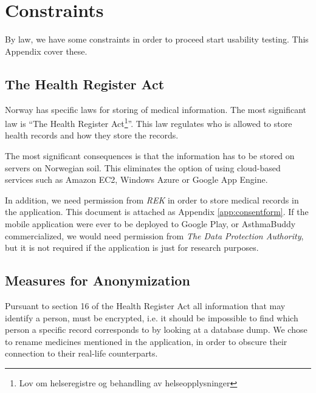 
\chapter{Constraints}
\label{chp:securityrequirements}

By law, we have some constraints in order to proceed start usability testing. This Appendix cover these. 

\section{The Health Register Act}
\label{sec:helseregisterloven}

Norway has specific laws for storing of medical information. The most significant law is ``The Health Register Act\footnote{Lov om helseregistre og behandling av helseopplysninger}''\cite{helseregisterloven}. This law regulates who is allowed to store health records and how they store the records. 

The most significant consequences is that the information has to be stored on servers on Norwegian soil. This eliminates the option of using cloud-based services such as Amazon EC2, Windows Azure or Google App Engine. 

In addition, we need permission from \emph{REK} in order to store medical records in the application. This document is attached as Appendix \ref{app:consentform}. If the mobile application were ever to be deployed to Google Play, or AsthmaBuddy commercialized, we would need permission from \emph{The Data Protection Authority}, but it is not required if the application is just for research purposes. 

\section{Measures for Anonymization}
\label{sec:measuresforanonymization}
Pursuant to section 16 of the Health Register Act\cite{helseregisterloven} all information that may identify a person, must be encrypted, i.e. it should be impossible to find which person a specific record corresponds to by looking at a database dump. We chose to rename medicines mentioned in the application, in order to obscure their connection to their real-life counterparts. 